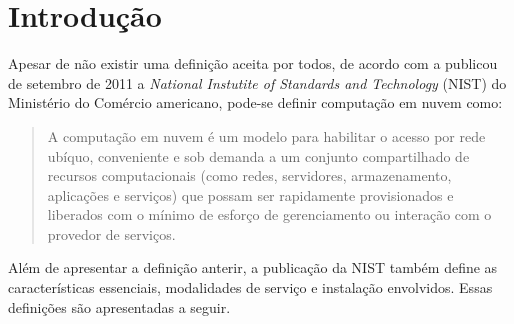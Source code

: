 \section{Introdução} \label{intro}
Apesar de não existir uma definição aceita por todos,
de acordo com a publicou de setembro de 2011 a
\textit{National Instutite of Standards and Technology}
(NIST) do Ministério do Comércio americano, pode-se
definir computação em nuvem como:

\begin{quote}
  A computação em nuvem é um modelo para habilitar o acesso por 
  rede ubíquo, conveniente e sob demanda a um conjunto
  compartilhado de recursos computacionais (como redes, servidores,
  armazenamento, aplicações e serviços) que possam ser rapidamente
  provisionados e liberados com o mínimo de esforço de gerenciamento
  ou interação com o provedor de serviços.
\end{quote}

Além de apresentar a definição anterir, a publicação da NIST também
define as características essenciais, modalidades de serviço e
instalação envolvidos. Essas definições são apresentadas a seguir.




